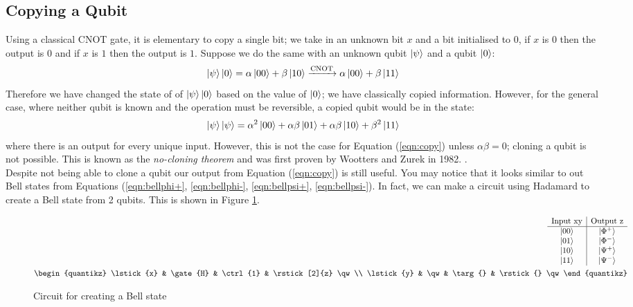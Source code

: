 \documentclass[reqno]{amsart}
\numberwithin{equation}{section}
\numberwithin{figure}{section}
\begin{document}
\subsection{Copying a Qubit}
\begin{justify}
    Using a classical CNOT gate, it is elementary to copy a single bit; we take in an unknown bit $x$ and a bit initialised to $0$, if $x$ is $0$ then the output is $0$ and if $x$ is $1$ then the output is $1$. Suppose we do the same with an unknown qubit $\ket{\psi}$ and a qubit $\ket{0}$:
    \begin{equation}
        \ket{\psi}\ket{0} = \alpha\ket{00} + \beta\ket{10} \xrightarrow{\text{CNOT}} \alpha\ket{00} + \beta\ket{11} \label{eqn:copy}
    \end{equation}
    Therefore we have changed the state of of $\ket{\psi}\ket{0}$ based on the value of $\ket{0}$; we have classically copied information. However, for the general case, where neither qubit is known and the operation must be reversible, a copied qubit would be in the state:
    \begin{equation}
        \ket{\psi}\ket{\psi} = \alpha^{2}\ket{00} + \alpha\beta\ket{01} + \alpha\beta\ket{10} + \beta^{2}\ket{11}
    \end{equation}
    where there is an output for every unique input. However, this is not the case for Equation (\ref{eqn:copy}) unless $\alpha\beta=0$; cloning a qubit is not possible. This is known as the \textit{no-cloning theorem} and was first proven by Wootters and Zurek in 1982. \cite{WoottersZurek1982}. \\

    Despite not being able to clone a qubit our output from Equation (\ref{eqn:copy}) is still useful. You may notice that it looks similar to out Bell states from Equations (\ref{eqn:bellphi+}, \ref{eqn:bellphi-}, \ref{eqn:bellpsi+}, \ref{eqn:bellpsi-}). In fact, we can make a circuit using Hadamard to create a Bell state from 2 qubits. This is shown in Figure \ref{fig:BellState}.
    \begin{figure}[h]
        \begin{eqnarray*}
            \begin{array}{c|c}
                \text{Input xy} & \text{Output z} \\ 
                \hline
                \ket{00} & \ket{\Phi^{+}} \\
                \ket{01} & \ket{\Phi^{-}} \\
                \ket{10} & \ket{\Psi^{+}} \\
                \ket{11} & \ket{\Psi^{-}}
            \end{array} \\
            \begin{quantikz}
                \lstick{x} & \gate{H} & \ctrl{1} & \rstick[2]{z} \qw \\
                \lstick{y} & \qw & \targ{} & \rstick{} \qw
            \end{quantikz}
        \end{eqnarray*}
        \caption{Circuit for creating a Bell state}
        \label{fig:BellState}
    \end{figure}
\end{justify}
\end{document}
